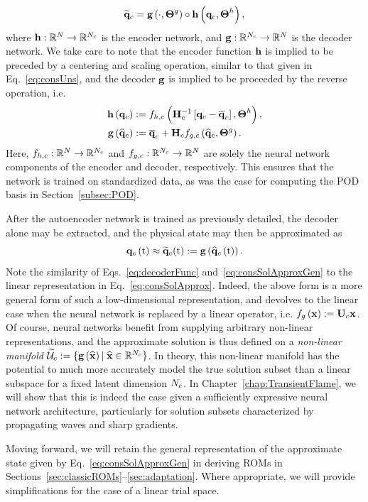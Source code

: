 %
\begin{equation}
    \mathbf{\widetilde{q}}_{c} = \mathbf{g} \left(\cdot, \boldsymbol{\Theta}^{g}\right) \circ \mathbf{h} \left(\mathbf{q}_{c}, \boldsymbol{\Theta}^{h}\right),
\end{equation}
%
where $\mathbf{h}: \mathbb{R}^{N} \rightarrow \mathbb{R}^{N_c}$ is the encoder network, and $\mathbf{g}: \mathbb{R}^{N_c} \rightarrow \mathbb{R}^{N}$ is the decoder network. We take care to note that the encoder function $\mathbf{h}$ is implied to be preceded by a centering and scaling operation, similar to that given in Eq.~\ref{eq:consUns}, and the decoder $\mathbf{g}$ is implied to be proceeded by the reverse operation, i.e.
%
\begin{align}
    \encoderFunc{\consVec} &\defEq \nnLayer_{\encoderVar,\consVar} \left(\consScaleInv\left[\consVec - \consVecCent\right], \nnParams^{\encoderVar}\right), \\
    \decoderFunc{\consVecCoef} &\defEq \consVecCent + \consScale \nnLayer_{\decoderVar,\consVar} \left(\consVecCoef, \nnParams^{\decoderVar}\right). \label{eq:decoderFunc}
\end{align}
%
Here, $f_{h,c}: \mathbb{R}^{N} \rightarrow \mathbb{R}^{N_c}$ and $f_{g,c}: \mathbb{R}^{N_c} \rightarrow \mathbb{R}^{N}$ are solely the neural network components of the encoder and decoder, respectively. This ensures that the network is trained on standardized data, as was the case for computing the POD basis in Section~\ref{subsec:POD}.

After the autoencoder network is trained as previously detailed, the decoder alone may be extracted, and the physical state may then be approximated as
%
\begin{equation}\label{eq:consSolApproxGen}
    \mathbf{q}_{c}\left(\text{t}\right) \approx \mathbf{\widetilde{q}}_{c}(\text{t}) := \mathbf{g} \left(\mathbf{\widehat{q}}_{c}\left(\text{t}\right)\right).
\end{equation}
%
Note the similarity of Eqs.~\ref{eq:decoderFunc} and~\ref{eq:consSolApproxGen} to the linear representation in Eq.~\ref{eq:consSolApprox}. Indeed, the above form is a more general form of such a low-dimensional representation, and devolves to the linear case when the neural network is replaced by a linear operator, i.e. $\nnLayer_{\decoderVar} \left(\nnInput\right) \defEq \consTrial \nnInput$. Of course, neural networks benefit from supplying arbitrary non-linear representations, and the approximate solution is thus defined on a \textit{non-linear manifold} $\consTrialSpace \defEq \{\decoderFunc{\nnInputCoef} \vert \; \nnInputCoef \inROne{\numConsModes} \}$. In theory, this non-linear manifold has the potential to much more accurately model the true solution subset than a linear subspace for a fixed latent dimension $N_c$. In Chapter~\ref{chap:TransientFlame}, we will show that this is indeed the case given a sufficiently expressive neural network architecture, particularly for solution subsets characterized by propagating waves and sharp gradients.

Moving forward, we will retain the general representation of the approximate state given by Eq.~\ref{eq:consSolApproxGen} in deriving ROMs in Sections~\ref{sec:classicROMs}--\ref{sec:adaptation}. Where appropriate, we will provide simplifications for the case of a linear trial space.
